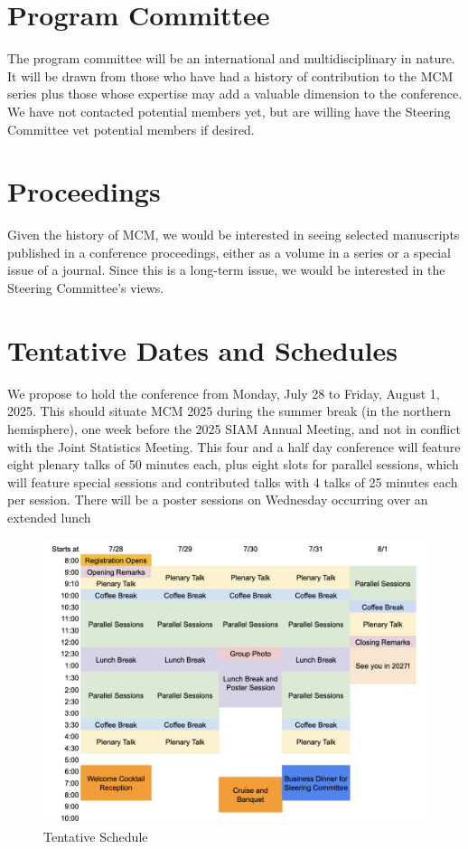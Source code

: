\documentclass{article}
\newcommand{\yuhannote}[1]{{\color{purple}Yuhan: #1}}
\begin{document}
\section{Program Committee}
The program committee will be an international and multidisciplinary in nature.  It will be drawn from those who have had a history of contribution to the MCM series plus those whose expertise may add a valuable dimension to the conference.  We have not contacted potential members yet, but are willing have the Steering Committee vet potential members if desired.

\section{Proceedings}

Given the history of MCM, we would be interested in seeing selected manuscripts published in a conference proceedings, either as a volume in a series or a special issue of a journal.  Since this is a long-term issue, we would be interested in the Steering Committee's views.

\section{Tentative Dates and Schedules}

We propose to hold the conference from Monday, July 28 to Friday, August 1, 2025.  This should situate MCM 2025 during the summer break (in the northern hemisphere), one week before the 2025 SIAM Annual Meeting, and not in conflict with the Joint Statistics Meeting.  This four and a half day conference will feature eight plenary talks of 50 minutes each, plus eight slots for parallel sessions, which will feature special sessions and contributed talks with 4 talks of 25 minutes each per session.
There will be a poster sessions on Wednesday occurring over an extended lunch

\begin{figure}[h]
    \centering
    \includegraphics[width =.95\textwidth]{schedulev3_2.png}
    \caption{Tentative Schedule}
\end{figure}
\end{document}
